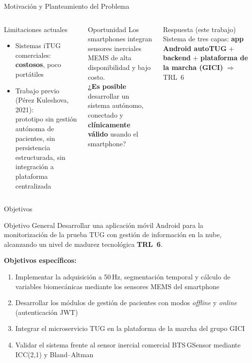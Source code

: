 \documentclass[10pt,aspectratio=169]{beamer}
\begin{document}
\begin{frame}{Motivación y Planteamiento del Problema}
  \begin{columns}[t]
      \begin{alertblock}{Limitaciones actuales}
        \begin{itemize}
          \item Sistemas iTUG comerciales: \textbf{costosos}, poco portátiles
          \item Trabajo previo (Pérez Kuleshova, 2021):\\
                prototipo sin gestión autónoma de pacientes, sin
                persistencia estructurada, sin integración a
                plataforma centralizada
        \end{itemize}
      \end{alertblock}
      \begin{block}{Oportunidad}
        Los smartphones integran sensores inerciales MEMS de
        alta disponibilidad y bajo costo.\\[0.5em]
        \textbf{¿Es posible} desarrollar un sistema autónomo,
        conectado y \textbf{clínicamente válido} usando el smartphone?
      \end{block}
      \vspace{0.5em}
      \begin{block}{Respuesta (este trabajo)}
        Sistema de tres capas: \textbf{app Android autoTUG} +
        \textbf{backend} + \textbf{plataforma de la marcha (GICI)}
        $\Rightarrow$ TRL~6
      \end{block}
  \end{columns}
\end{frame}

\begin{frame}{Objetivos}
  \begin{block}{Objetivo General}
    Desarrollar una aplicación móvil Android para la monitorización
    de la prueba TUG con gestión de información en la nube,
    alcanzando un nivel de madurez tecnológica \textbf{TRL~6}.
  \end{block}
  \vspace{0.6em}
  \textbf{Objetivos específicos:}
  \begin{enumerate}
    \item Implementar la adquisición a 50\,Hz, segmentación temporal y
          cálculo de variables biomecánicas mediante los sensores MEMS del
          smartphone
    \item Desarrollar los módulos de gestión de pacientes con modos
          \textit{offline} y \textit{online} (autenticación JWT)
    \item Integrar el microservicio TUG en la plataforma de la marcha
          del grupo GICI
    \item Validar el sistema frente al sensor inercial comercial
          BTS\,GSensor mediante ICC(2,1) y Bland--Altman
  \end{enumerate}
\end{frame}
\end{document}
